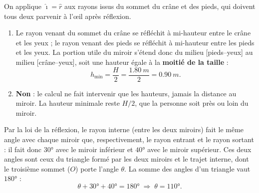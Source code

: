 \documentclass[11pt,a4paper]{article}
\begin{document}
\begin{corrige}
On applique $\hat{\imath}=\hat{r}$ aux rayons issus du sommet du crâne et des pieds, qui doivent tous
deux parvenir à l'\oe il après réflexion.
\begin{enumerate}[label=\alph*)]
  \item Le rayon venant du sommet du crâne se réfléchit à mi-hauteur entre le crâne et les yeux ; le
        rayon venant des pieds se réfléchit à mi-hauteur entre les pieds et les yeux. La portion utile
        du miroir s'étend donc du milieu [pieds–yeux] au milieu [crâne–yeux], soit une hauteur égale à
        la \textbf{moitié de la taille} :
        \[ h_{\min}=\frac{H}{2}=\frac{\qty{1.80}{m}}{2}=\qty{0.90}{m}. \]
  \item \textbf{Non} : le calcul ne fait intervenir que les hauteurs, jamais la distance au miroir. La
        hauteur minimale reste $H/2$, que la personne soit près ou loin du miroir.
\end{enumerate}
\end{corrige}

\begin{corrige}
Par la loi de la réflexion, le rayon interne (entre les deux miroirs) fait le même angle avec chaque
miroir que, respectivement, le rayon entrant et le rayon sortant : il fait donc $\ang{30}$ avec le
miroir inférieur et $\ang{40}$ avec le miroir supérieur. Ces deux angles sont ceux du triangle formé
par les deux miroirs et le trajet interne, dont le troisième sommet ($O$) porte l'angle $\theta$. La
somme des angles d'un triangle vaut $\ang{180}$ :
\[ \theta+\ang{30}+\ang{40}=\ang{180}\;\Longrightarrow\;\boxed{\theta=\ang{110}}. \]
\end{corrige}
\end{document}
